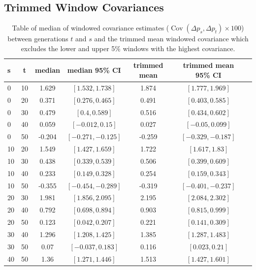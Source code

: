 \documentclass[11pt]{article}
\DeclareMathOperator{\cov}{Cov}
\begin{document}
\subsection{\textcite{Barghi2019-qy} Trimmed Window Covariances}
\begin{table}
  \centering
  \footnotesize
  \centering
  \begin{tabular}{l c c c c c c}

    s & t & median & median 95\% CI & trimmed mean & trimmed mean 95\% CI \\ \hline
    0 & 10 & 1.629 & $[1.532, 1.738]$ & 1.874 & $[1.777, 1.969]$ \\
    0 & 20 & 0.371 & $[0.276, 0.465]$ & 0.491 & $[0.403, 0.585]$ \\
    0 & 30 & 0.479 & $[0.4, 0.589]$ & 0.516 & $[0.434, 0.602]$ \\
    0 & 40 & 0.059 & $[-0.012, 0.15]$ & 0.027 & $[-0.05, 0.099]$ \\
    0 & 50 & -0.204 & $[-0.271, -0.125]$ & -0.259 & $[-0.329, -0.187]$ \\
    10 & 20 & 1.549 & $[1.427, 1.659]$ & 1.722 & $[1.617, 1.83]$ \\
    10 & 30 & 0.438 & $[0.339, 0.539]$ & 0.506 & $[0.399, 0.609]$ \\
    10 & 40 & 0.233 & $[0.149, 0.328]$ & 0.254 & $[0.159, 0.343]$ \\
    10 & 50 & -0.355 & $[-0.454, -0.289]$ & -0.319 & $[-0.401, -0.237]$ \\
    20 & 30 & 1.981 & $[1.856, 2.095]$ & 2.195 & $[2.084, 2.302]$ \\
    20 & 40 & 0.792 & $[0.698, 0.894]$ & 0.903 & $[0.815, 0.999]$ \\
    20 & 50 & 0.123 & $[0.042, 0.207]$ & 0.221 & $[0.141, 0.309]$ \\
    30 & 40 & 1.296 & $[1.208, 1.425]$ & 1.385 & $[1.287, 1.483]$ \\
    30 & 50 & 0.07 & $[-0.037, 0.183]$ & 0.116 & $[0.023, 0.21]$ \\
    40 & 50 & 1.36 & $[1.271, 1.446]$ & 1.513 & $[1.427, 1.601]$ \\


   \end{tabular}
   \caption{Table of median of windowed covariance estimates ($\cov(\Delta p_s,
     \Delta p_t) \times 100$) between generations $t$ and $s$ and the trimmed
     mean windowed covariance which excludes the lower and upper 5\% windows
     with the highest covariance.}
  \label{supp:table-trimmed-mean}

\end{table}
\end{document}
